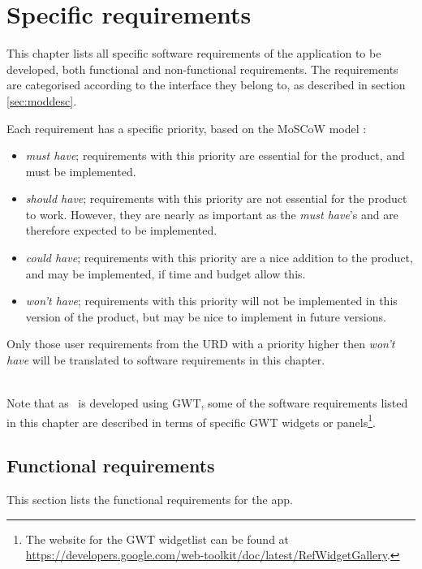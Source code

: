 \chapter{Specific requirements}
\label{chap:specreq}
This chapter lists all specific software requirements of the application to be developed, both functional and non-functional requirements. The requirements are categorised according to the interface they belong to, as described in section \ref{sec:moddesc}.

Each requirement has a specific priority, based on the MoSCoW model \cite{moscow}:

\begin{itemize}
    \item \emph{must have}; requirements with this priority are essential for the product, and must be implemented.
    \item \emph{should have}; requirements with this priority are not essential for the product to work. However, they are nearly as important as the \emph{must have}'s and are therefore expected to be implemented.
    \item \emph{could have}; requirements with this priority are a nice addition to the product, and may be implemented, if time and budget allow this.
    \item \emph{won't have}; requirements with this priority will not be implemented in this version of the product, but may be nice to implement in future versions.
\end{itemize}

Only those user requirements from the URD \cite{urd} with a priority higher then \emph{won't have} will be translated to software requirements in this chapter.

 \\
Note that as \applicationname\ is developed using GWT, some of the software requirements listed in this chapter are described in terms of specific GWT widgets or panels\footnote{The website for the GWT widgetlist can be found at \url{https://developers.google.com/web-toolkit/doc/latest/RefWidgetGallery}.}.


\section{Functional requirements}
\label{sec:funcreq}
This section lists the functional requirements for the \projectname app.

